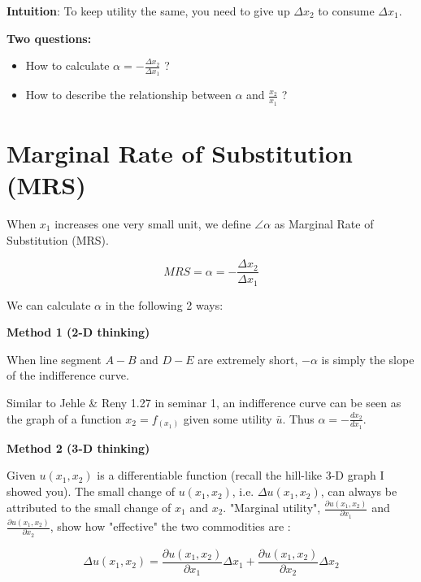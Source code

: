 \documentclass{article}
\begin{document}
\begin{mdframed}[backgroundcolor=blue!20,linecolor=white]
\textbf{Intuition}: To keep utility the same, you need to give up $\Delta x_2$ to consume $\Delta x_1$. 

\vspace{4mm}

\textbf{Two questions:}

\begin{itemize}
\item How to calculate $\alpha = - \frac{\Delta x_2}{\Delta x_1}$ ?
\item How to describe the relationship between $\alpha$ and $\frac{x_2}{x_1}$ ?
\end{itemize}

\section{Marginal Rate of Substitution (MRS)}

When $x_1$ increases one very small unit, we define $\angle \alpha$ as Marginal Rate of Substitution (MRS). 

$$MRS = \alpha = - \frac{\Delta x_2}{\Delta x_1}$$

We can calculate $\alpha$  in the following 2 ways:

\vspace{4mm}

\textbf{Method 1 (2-D thinking)}

When line segment $A-B$ and $D-E$ are extremely short, $- \alpha$ is simply the slope of the indifference curve.

Similar to Jehle \& Reny 1.27 in seminar 1, an indifference curve can be seen as the graph of a function $x_2 = f_(x_1)$ given some utility $\bar{u}$. Thus $\alpha = - \frac{dx_2}{dx_1}$.

\vspace{2mm}

\textbf{Method 2 (3-D thinking)}

Given $u(x_1,x_2)$ is a differentiable function (recall the hill-like 3-D graph I showed you). The small change of $u(x_1,x_2)$, i.e. $\Delta u(x_1,x_2)$, can always be attributed to the small change of $x_1$ and  $x_2$. "Marginal utility", $\frac{\partial u(x_1,x_2)}{\partial x_1}$ and $\frac{\partial u(x_1,x_2)}{\partial x_2}$, show how "effective" the two commodities are :

$$\Delta u(x_1,x_2) = \frac{\partial u(x_1,x_2)}{\partial x_1} \Delta x_1 + \frac{\partial u(x_1,x_2)}{\partial x_2} \Delta x_2$$


\end{mdframed}
\end{document}
